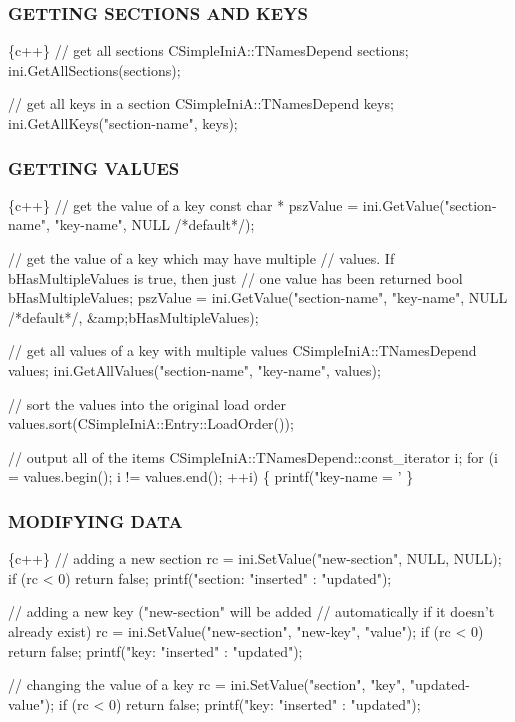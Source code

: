 \subsubsection*{G\+E\+T\+T\+I\+NG S\+E\+C\+T\+I\+O\+NS A\+ND K\+E\+YS}


\begin{DoxyCode}
\{c++\}
// get all sections
CSimpleIniA::TNamesDepend sections;
ini.GetAllSections(sections);

// get all keys in a section
CSimpleIniA::TNamesDepend keys;
ini.GetAllKeys("section-name", keys);
\end{DoxyCode}


\subsubsection*{G\+E\+T\+T\+I\+NG V\+A\+L\+U\+ES}


\begin{DoxyCode}
\{c++\}
// get the value of a key
const char * pszValue = ini.GetValue("section-name", 
    "key-name", NULL /*default*/);

// get the value of a key which may have multiple 
// values. If bHasMultipleValues is true, then just 
// one value has been returned
bool bHasMultipleValues;
pszValue = ini.GetValue("section-name", "key-name", 
    NULL /*default*/, &amp;bHasMultipleValues);

// get all values of a key with multiple values
CSimpleIniA::TNamesDepend values;
ini.GetAllValues("section-name", "key-name", values);

// sort the values into the original load order
values.sort(CSimpleIniA::Entry::LoadOrder());

// output all of the items
CSimpleIniA::TNamesDepend::const\_iterator i;
for (i = values.begin(); i != values.end(); ++i) \{ 
    printf("key-name = '%
\}
\end{DoxyCode}


\subsubsection*{M\+O\+D\+I\+F\+Y\+I\+NG D\+A\+TA}


\begin{DoxyCode}
\{c++\}
// adding a new section
rc = ini.SetValue("new-section", NULL, NULL);
if (rc < 0) return false;
printf("section: %
    "inserted" : "updated");

// adding a new key ("new-section" will be added 
// automatically if it doesn't already exist)
rc = ini.SetValue("new-section", "new-key", "value");
if (rc < 0) return false;
printf("key: %
    "inserted" : "updated");

// changing the value of a key
rc = ini.SetValue("section", "key", "updated-value");
if (rc < 0) return false;
printf("key: %
    "inserted" : "updated");
\end{DoxyCode}


